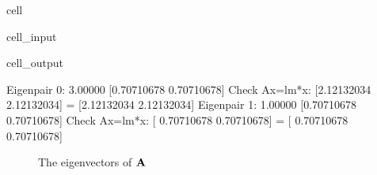 \documentclass[letterpaper,10pt,english]{jupyterBook}
\begin{document}
\begin{sphinxuseclass}{cell}\begin{sphinxVerbatimInput}

\begin{sphinxuseclass}{cell_input}
\begin{sphinxVerbatim}[commandchars=\\\{\}]
   
  \PYG{p}{[}\PYG{p}{[} \PYG{p}{]}
     \PYG{p}{[} \PYG{p}{]}\PYG{p}{]}
   
   
    \PYG{p}{[}\PYG{p}{]}
    \PYG{p}{[}\PYG{p}{]}
\end{sphinxVerbatim}

\end{sphinxuseclass}\end{sphinxVerbatimInput}
\begin{sphinxVerbatimOutput}

\begin{sphinxuseclass}{cell_output}
\begin{sphinxVerbatim}[commandchars=\\\{\}]
Eigenpair 0:
3.00000 \PYGZhy{}\PYGZhy{}\PYGZgt{} [0.70710678 0.70710678]
Check Ax=lm*x: [2.12132034 2.12132034] = [2.12132034 2.12132034]
Eigenpair 1:
\PYGZhy{}1.00000 \PYGZhy{}\PYGZhy{}\PYGZgt{} [\PYGZhy{}0.70710678  0.70710678]
Check Ax=lm*x: [ 0.70710678 \PYGZhy{}0.70710678] = [ 0.70710678 \PYGZhy{}0.70710678]
\end{sphinxVerbatim}

\end{sphinxuseclass}\end{sphinxVerbatimOutput}

\end{sphinxuseclass}
\begin{figure}[htbp]
\centering
\capstart

\noindent{}
\caption{The eigenvectors of \({\bf A}\)}\label{\detokenize{05.linear_algebra:id17}}\end{figure}
\end{document}
